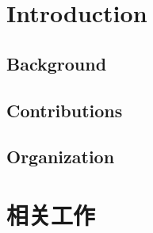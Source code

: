 \documentclass[a4paper,twoside,AutoFakeBold]{article}
\theoremstyle{definition}
\begin{document}

\maketitle
\thispagestyle{empty} \cleardoublepage

\rptcontent \thispagestyle{empty} \cleardoublepage

\begin{abstract}\kaiti \xiaosi
\end{abstract}
\cleardoublepage

\songti\xiaosi
%
\section{Introduction}
\subsection{Background}

\subsection{Contributions}

\subsection{Organization}

%
\section{相关工作}\label{section:related}
\end{document}
